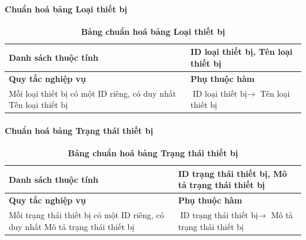 \paragraph{Chuẩn hoá bảng Loại thiết bị}
\mbox{}
\begin{table}[H]
	\caption{\bfseries \fontsize{12pt}{0pt}\selectfont Bảng chuẩn hoá bảng Loại thiết bị}
	\centering
	\begin{tabularx}{0.9\textwidth}{|X|X|}
		\hline
		\textbf{Danh sách thuộc tính} & ID loại thiết bị, Tên loại thiết bị                                             \\
		\hline
		\textbf{Quy tắc nghiệp vụ}    & \textbf{Phụ thuộc hàm}                                                          \\
		\hline
		Mỗi loại thiết bị có một ID riêng, có duy nhất Tên loại thiết bị
		                              & \parbox[t]{\linewidth}{$\text{ID loại thiết bị} \rightarrow$ Tên loại thiết bị} \\
		\hline
		                                \\
		                                          \\
		\hline
	\end{tabularx}
\end{table}

\paragraph{Chuẩn hoá bảng Trạng thái thiết bị}
\mbox{}
\begin{table}[H]
	\caption{\bfseries \fontsize{12pt}{0pt}\selectfont Bảng chuẩn hoá bảng Trạng thái thiết bị}
	\centering
	\begin{tabularx}{0.9\textwidth}{|X|X|}
		\hline
		\textbf{Danh sách thuộc tính} & ID trạng thái thiết bị, Mô tả trạng thái thiết bị                                             \\
		\hline
		\textbf{Quy tắc nghiệp vụ}    & \textbf{Phụ thuộc hàm}                                                                        \\
		\hline
		Mỗi trạng thái thiết bị có một ID riêng, có duy nhất Mô tả trạng thái thiết bị
		                              & \parbox[t]{\linewidth}{$\text{ID trạng thái thiết bị} \rightarrow$ Mô tả trạng thái thiết bị} \\
		\hline
		                                        \\
		                                                  \\
		\hline
	\end{tabularx}
\end{table}

